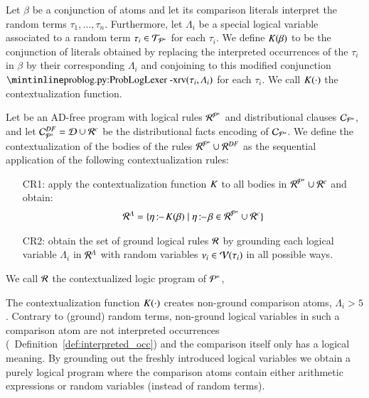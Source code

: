 \begin{definition} \label{def:context_function}
	Let $\beta$ be a conjunction of atoms and let its comparison literals interpret the random terms $\tau_1,\ldots,\tau_n$.
	Furthermore, let $\Lambda_i$ be a special logical variable associated to a random term $\tau_i \in \mathcal{T}_{{{\mathcal{P}}^{*}}}$ for each $\tau_i$.
	We define $K(\beta)$ to be the  conjunction of literals obtained by replacing the interpreted occurrences of the $\tau_i$ in $\beta$ by their corresponding $\Lambda_i$
	and conjoining to this modified conjunction $\text{\probloginline{rv}}(\tau_i,\Lambda_i)$ for each $\tau_i$.
	We call $K(\cdot)$ the contextualization function.
\end{definition}

\begin{definition}\label{def:adfree-to-core}
	Let \adfreeprogram be an AD-free program with logical rules ${\mathcal{R}}^{{\mathcal{P}}^{*}}$ and distributional clauses $\mathcal{C}_{{\mathcal{P}}^{*}}$,
	and let $\mathcal{C}_{{\mathcal{P}}^{*}}^{DF}=\mathcal{D}\cup {\mathcal{R}}^{c}$ be the distributional facts encoding of $\mathcal{C}_{{\mathcal{P}}^{*}}$. We define the contextualization of the bodies of the rules ${\mathcal{R}}^{{\mathcal{P}}^{*}} \cup {\mathcal{R}}^{DF}$ as the sequential application of the following contextualization rules:
	\begin{enumerate}[label=\alph*.]
		\item[CR1:] apply the contextualization function $K$ to all bodies in ${\mathcal{R}}^{{\mathcal{P}}^{*}}\cup {\mathcal{R}}^{c}$ and obtain:
		      \begin{align*}
			      {\mathcal{R}}^\Lambda = \{\eta \operatorname*{\mathtt{{:}{\---}}} K(\beta) \mid \eta \operatorname*{\mathtt{{:}{\---}}} \beta \in {\mathcal{R}}^{{\mathcal{P}}^{*}} \cup {\mathcal{R}}^{c} \}
		      \end{align*}
		\item[CR2:] obtain the set of ground logical rules ${\mathcal{R}}$ by grounding each logical variable $\Lambda_i$ in ${\mathcal{R}}^\Lambda$  with random variables $\nu_i\in \mathcal{V}(\tau_i)$ in all possible ways.
	\end{enumerate}
	We call ${\mathcal{R}}$ the contextualized logic program of ${{\mathcal{P}}^{*}}$, 
\end{definition}

The contextualization function $K(\cdot)$ creates non-ground comparison atoms, \eg $\Lambda_i>5$. Contrary to (ground) random terms, non-ground logical variables in such a comparison atom are not interpreted occurrences (\cf~Definition~\ref{def:interpreted_occ}) and the comparison itself only has a logical meaning. By grounding out the freshly introduced logical variables we obtain a purely logical program where the comparison atoms contain either arithmetic expressions or random variables (instead of random terms).



